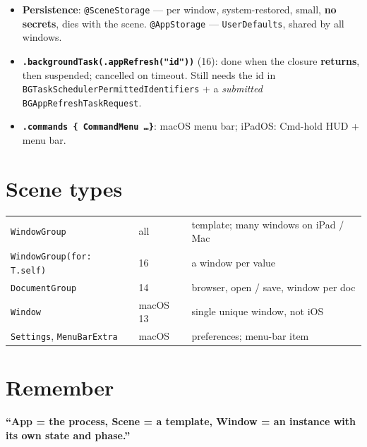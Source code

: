 \documentclass[8pt]{extarticle}
\begin{document}
\begin{multicols}{2}
\begin{itemize}
{        .discarded / .systemAction}); \texttt{openWindow(id:/value:)} (16) — a window already showing the value
        comes forward; \texttt{dismissWindow} (17); \texttt{supportsMultipleWindows}.
  \item \textbf{Persistence}: \texttt{@SceneStorage} — per window, system-restored, small, \textbf{no
        secrets}, dies with the scene. \texttt{@AppStorage} — \texttt{UserDefaults}, shared by all windows.
  \item \textbf{\texttt{.backgroundTask(.appRefresh("id"))}} (16): done when the closure \textbf{returns},
        then suspended; cancelled on timeout. Still needs the id in
        \texttt{BGTaskSchedulerPermittedIdentifiers} + a \emph{submitted} \texttt{BGAppRefreshTaskRequest}.
  \item \textbf{\texttt{.commands \{ CommandMenu \ldots \}}}: macOS menu bar; iPadOS: Cmd-hold HUD + menu bar.
\end{itemize}

\section{Scene types}
{\footnotesize\setlength{\tabcolsep}{3pt}
\begin{tabular}{@{}L{34mm}L{11mm}L{33mm}@{}}
\toprule
\texttt{WindowGroup} & all & template; many windows on iPad / Mac \\
\texttt{WindowGroup(for: T.self)} & 16 & a window per value \\
\texttt{DocumentGroup} & 14 & browser, open / save, window per doc \\
\texttt{Window} & macOS 13 & single unique window, not iOS \\
\texttt{Settings}, \texttt{MenuBarExtra} & macOS & preferences; menu-bar item \\
\bottomrule
\end{tabular}\par}

\section{Remember}
\textbf{``App = the process, Scene = a template, Window = an instance with its own state and phase.''}


\columnbreak


\end{multicols}
\end{document}
